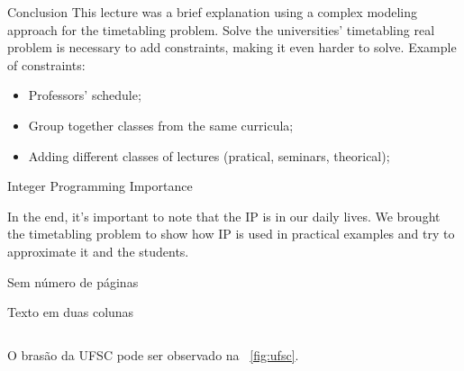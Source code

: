 \documentclass{beamer}
\begin{document}
\begin{frame}{Conclusion}
This lecture was a brief explanation using a complex modeling approach for the timetabling problem. Solve the universities' timetabling real problem is necessary to add constraints, making it even harder to solve. 
Example of constraints:
    \begin{itemize}
        \item Professors' schedule;
        \item Group together classes from the same curricula;
        \item Adding different classes of lectures (pratical, seminars, theorical);
    \end{itemize}
    

\end{frame}

\begin{frame}{Integer Programming Importance}

In the end, it's important to note that the IP is in our daily lives. We brought the timetabling problem to show how IP is used in practical examples and try to approximate it and the students.

\end{frame}

\begin{frame}[plain]{Sem número de páginas}
\lipsum[1]
\end{frame}


\begin{frame}{Texto em duas colunas}
  \begin{columns}[c]
    \begin{column}{.5\textwidth}

	O brasão da UFSC pode ser observado na \figurename~\ref{fig:ufsc}.

    \end{column}
    \begin{column}{.5\textwidth}


    \end{column}
  \end{columns}
\end{frame}
\end{document}
